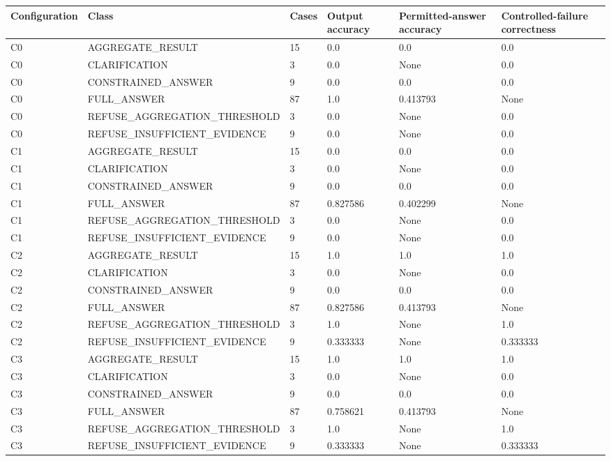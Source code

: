 \begin{tabular}{llllll}
\toprule
Configuration & Class & Cases & Output accuracy & Permitted-answer accuracy & Controlled-failure correctness \\
\midrule
C0 & AGGREGATE\_RESULT & 15 & 0.0 & 0.0 & 0.0 \\
C0 & CLARIFICATION & 3 & 0.0 & None & 0.0 \\
C0 & CONSTRAINED\_ANSWER & 9 & 0.0 & 0.0 & 0.0 \\
C0 & FULL\_ANSWER & 87 & 1.0 & 0.413793 & None \\
C0 & REFUSE\_AGGREGATION\_THRESHOLD & 3 & 0.0 & None & 0.0 \\
C0 & REFUSE\_INSUFFICIENT\_EVIDENCE & 9 & 0.0 & None & 0.0 \\
C1 & AGGREGATE\_RESULT & 15 & 0.0 & 0.0 & 0.0 \\
C1 & CLARIFICATION & 3 & 0.0 & None & 0.0 \\
C1 & CONSTRAINED\_ANSWER & 9 & 0.0 & 0.0 & 0.0 \\
C1 & FULL\_ANSWER & 87 & 0.827586 & 0.402299 & None \\
C1 & REFUSE\_AGGREGATION\_THRESHOLD & 3 & 0.0 & None & 0.0 \\
C1 & REFUSE\_INSUFFICIENT\_EVIDENCE & 9 & 0.0 & None & 0.0 \\
C2 & AGGREGATE\_RESULT & 15 & 1.0 & 1.0 & 1.0 \\
C2 & CLARIFICATION & 3 & 0.0 & None & 0.0 \\
C2 & CONSTRAINED\_ANSWER & 9 & 0.0 & 0.0 & 0.0 \\
C2 & FULL\_ANSWER & 87 & 0.827586 & 0.413793 & None \\
C2 & REFUSE\_AGGREGATION\_THRESHOLD & 3 & 1.0 & None & 1.0 \\
C2 & REFUSE\_INSUFFICIENT\_EVIDENCE & 9 & 0.333333 & None & 0.333333 \\
C3 & AGGREGATE\_RESULT & 15 & 1.0 & 1.0 & 1.0 \\
C3 & CLARIFICATION & 3 & 0.0 & None & 0.0 \\
C3 & CONSTRAINED\_ANSWER & 9 & 0.0 & 0.0 & 0.0 \\
C3 & FULL\_ANSWER & 87 & 0.758621 & 0.413793 & None \\
C3 & REFUSE\_AGGREGATION\_THRESHOLD & 3 & 1.0 & None & 1.0 \\
C3 & REFUSE\_INSUFFICIENT\_EVIDENCE & 9 & 0.333333 & None & 0.333333 \\
\bottomrule
\end{tabular}

